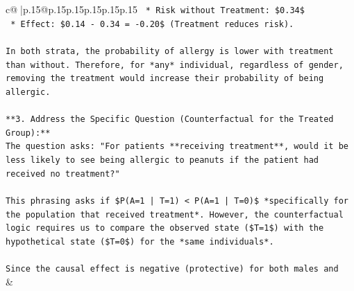 \documentclass{article}
\begin{document}
{\begin{supertabular}{c@{$\;$}|p{.15\linewidth}@{}p{.15\linewidth}p{.15\linewidth}p{.15\linewidth}p{.15\linewidth}p{.15\linewidth}}
{{{\texttt{    *   Risk without Treatment: \$0.34\$} \\
\texttt{    *   Effect: \$0.14 {-} 0.34 = {-}0.20\$ (Treatment reduces risk).} \\
\\ 
\texttt{In both strata, the probability of allergy is lower with treatment than without. Therefore, for *any* individual, regardless of gender, removing the treatment would increase their probability of being allergic.} \\
\\ 
\texttt{**3. Address the Specific Question (Counterfactual for the Treated Group):**} \\
\texttt{The question asks: "For patients **receiving treatment**, would it be less likely to see being allergic to peanuts if the patient had received no treatment?"} \\
\\ 
\texttt{This phrasing asks if \$P(A=1 | T=1) < P(A=1 | T=0)\$ *specifically for the population that received treatment*. However, the counterfactual logic requires us to compare the observed state (\$T=1\$) with the hypothetical state (\$T=0\$) for the *same individuals*.} \\
\\ 
\texttt{Since the causal effect is negative (protective) for both males and} \\
            }
        }
    }
    & \\ \\


\end{supertabular}}
\end{document}
